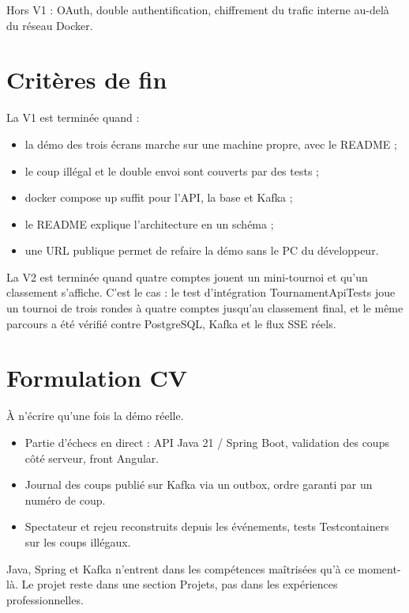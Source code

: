\documentclass[11pt,a4paper]{article}
\newcommand{\field}[1]{{\ttfamily #1}}
\begin{document}
Hors V1 : OAuth, double authentification, chiffrement du trafic interne au-delà du réseau Docker.

\section{Critères de fin}

La V1 est terminée quand :

\begin{itemize}
  \item la démo des trois écrans marche sur une machine propre, avec le README ;
  \item le coup illégal et le double envoi sont couverts par des tests ;
  \item \field{docker compose up} suffit pour l'API, la base et Kafka ;
  \item le README explique l'architecture en un schéma ;
  \item une URL publique permet de refaire la démo sans le PC du développeur.
\end{itemize}

La V2 est terminée quand quatre comptes jouent un mini-tournoi et qu'un classement s'affiche. C'est le cas : le test d'intégration \field{TournamentApiTests} joue un tournoi de trois rondes à quatre comptes jusqu'au classement final, et le même parcours a été vérifié contre PostgreSQL, Kafka et le flux SSE réels.

\section{Formulation CV}

À n'écrire qu'une fois la démo réelle.

\begin{itemize}
  \item Partie d'échecs en direct : API Java 21 / Spring Boot, validation des coups côté serveur, front Angular.
  \item Journal des coups publié sur Kafka via un outbox, ordre garanti par un numéro de coup.
  \item Spectateur et rejeu reconstruits depuis les événements, tests Testcontainers sur les coups illégaux.
\end{itemize}

Java, Spring et Kafka n'entrent dans les compétences maîtrisées qu'à ce moment-là. Le projet reste dans une section Projets, pas dans les expériences professionnelles.
\end{document}
